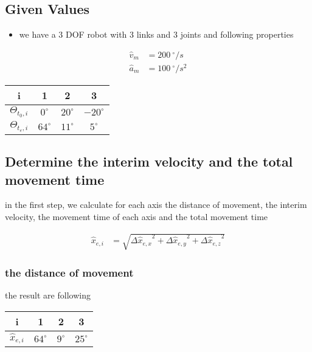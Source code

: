 \documentclass[%
  professionalfonts,%
  xcolor={%
    usenames,%
    dvipsnames,%
    svgnames,%
    table,%
    hyperref%
  }%
]{beamer}
\begin{document}
\subsection{Given Values }
\begin{frame}
\begin{itemize}
\item we have a 3 DOF robot with 3 links and 3 joints and following properties
\end{itemize}

\begin{align*}
\hat{v}_{m} & = 200 ~^\circ/s \\
\hat{a}_{m} & = 100 ~^\circ/s^2
\end{align*}

\begin{center}
\begin{tabular}{cccc}
\toprule
i & 1 & 2 & 3 \\
\midrule
$\Theta_{t_{0},i}$ & $  0^\circ$ & $20^\circ$ & $-20^\circ$ \\ 
$\Theta_{t_{e},i}$ & $ 64^\circ$ & $11^\circ$ & $  5^\circ$ \\
\bottomrule
\end{tabular}
\end{center}
\end{frame}

\subsection{Determine the interim velocity and the total movement time}
\begin{frame}
in the first step, we calculate for each axis the distance of movement, the interim velocity, the movement time of each axis and the total movement time

\begin{align*}
\hat{x}_{e,i} & = \sqrt{{\Delta\hat{x}_{e,x}}^{2} + {\Delta\hat{x}_{e,y}}^{2} + {\Delta\hat{x}_{e,z}}^{2} }
\end{align*}

\subsubsection*{the distance of movement }
the result are following    
\begin{center}
\begin{tabular}{cccc}
\toprule
i & 1 & 2 & 3 \\
\midrule
$\hat{x}_{e,i}$ & $ 64^\circ$ & $ 9^\circ$ & $25^\circ$ \\
\bottomrule 
\end{tabular}
\end{center}
\end{frame}
\end{document}
